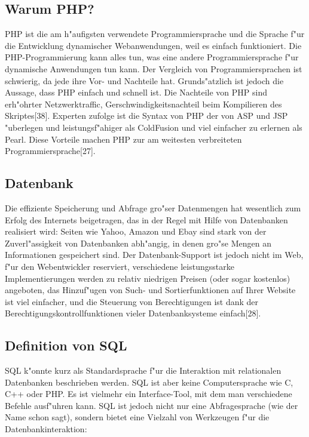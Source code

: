 \subsection{Warum PHP?}

PHP ist die am h"aufigsten verwendete Programmiersprache und die Sprache 
f"ur die Entwicklung dynamischer Webanwendungen,
weil es einfach funktioniert.
Die PHP-Programmierung kann alles tun, 
was eine andere Programmiersprache 
f"ur dynamische Anwendungen tun kann.
Der Vergleich von Programmiersprachen ist schwierig, 
da jede ihre Vor- und Nachteile hat. Grunds"atzlich ist 
jedoch die Aussage, dass PHP einfach und schnell ist. 
Die Nachteile von PHP sind erh"ohrter Netzwerktraffic,
Gerschwindigkeitsnachteil beim Kompilieren des Skriptes[38].
Experten zufolge ist die Syntax von PHP der von ASP 
 und JSP "uberlegen und leistungsf"ahiger als ColdFusion und viel 
einfacher zu erlernen als Pearl. Diese Vorteile machen PHP 
zur am weitesten verbreiteten Programmiersprache[27].

\subsection{Datenbank}

Die effiziente Speicherung und Abfrage gro"ser Datenmengen hat wesentlich 
zum Erfolg des Internets beigetragen, das in der Regel 
mit Hilfe von Datenbanken realisiert wird: Seiten wie Yahoo, Amazon 
und Ebay sind stark von der Zuverl"assigkeit von Datenbanken abh"angig, 
in denen gro"se Mengen an Informationen gespeichert sind.
Der Datenbank-Support ist jedoch nicht im Web, 
f"ur den Webentwickler reserviert, verschiedene leistungsstarke 
Implementierungen werden zu relativ niedrigen Preisen 
(oder sogar kostenlos) angeboten, 
das Hinzuf"ugen von Such- und Sortierfunktionen auf Ihrer 
Website ist viel einfacher, und die Steuerung von Berechtigungen 
ist dank der Berechtigungskontrollfunktionen 
vieler Datenbanksysteme einfach[28].

\subsection{Definition von SQL}

SQL k"onnte kurz als Standardsprache f"ur die Interaktion mit 
relationalen Datenbanken beschrieben werden. 
SQL ist aber keine Computersprache wie C, C++ oder PHP. 
Es ist vielmehr ein Interface-Tool, 
mit dem man verschiedene Befehle ausf"uhren kann. 
SQL ist jedoch nicht nur eine Abfragesprache (wie der Name schon sagt), 
sondern bietet eine Vielzahl von Werkzeugen f"ur die Datenbankinteraktion:


